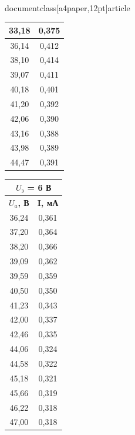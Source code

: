 \\documentclass[a4paper,12pt]{article}
\begin{document}
\begin{table}[h]
\begin{minipage}{0.3\textwidth}
\begin{tabular}{|cc|}
	\multicolumn{1}{|c|}{33,18} & 0,375 \\ \hline
	\multicolumn{1}{|c|}{36,14} & 0,412 \\ \hline
	\multicolumn{1}{|c|}{38,10} & 0,414 \\ \hline
	\multicolumn{1}{|c|}{39,07} & 0,411 \\ \hline
	\multicolumn{1}{|c|}{40,18} & 0,401 \\ \hline
	\multicolumn{1}{|c|}{41,20} & 0,392 \\ \hline
	\multicolumn{1}{|c|}{42,06} & 0,390 \\ \hline
	\multicolumn{1}{|c|}{43,16} & 0,388 \\ \hline
	\multicolumn{1}{|c|}{43,98} & 0,389 \\ \hline
	\multicolumn{1}{|c|}{44,47} & 0,391 \\ \hline
	\end{tabular}
\end{minipage}
\begin{minipage}{0.3\textwidth}
\begin{tabular}{|cc|}
\hline
\multicolumn{2}{|c|}{\textbf{$U_з$   = 6 В}} \\ \hline
\multicolumn{1}{|c|}{\textbf{$U_a$, В}} & \textbf{I, мА} \\ \hline
\multicolumn{1}{|c|}{36,24} & 0,361 \\ \hline
\multicolumn{1}{|c|}{37,20} & 0,364 \\ \hline
\multicolumn{1}{|c|}{38,20} & 0,366 \\ \hline
\multicolumn{1}{|c|}{39,09} & 0,362 \\ \hline
\multicolumn{1}{|c|}{39,59} & 0,359 \\ \hline
\multicolumn{1}{|c|}{40,50} & 0,350 \\ \hline
\multicolumn{1}{|c|}{41,23} & 0,343 \\ \hline
\multicolumn{1}{|c|}{42,00} & 0,337 \\ \hline
\multicolumn{1}{|c|}{42,46} & 0,335 \\ \hline
\multicolumn{1}{|c|}{44,06} & 0,324 \\ \hline
\multicolumn{1}{|c|}{44,58} & 0,322 \\ \hline
\multicolumn{1}{|c|}{45,18} & 0,321 \\ \hline
\multicolumn{1}{|c|}{45,66} & 0,319 \\ \hline
\multicolumn{1}{|c|}{46,22} & 0,318 \\ \hline
\multicolumn{1}{|c|}{47,00} & 0,318 \\ \hline

\end{tabular}
\end{minipage}
\end{table}
\end{document}
